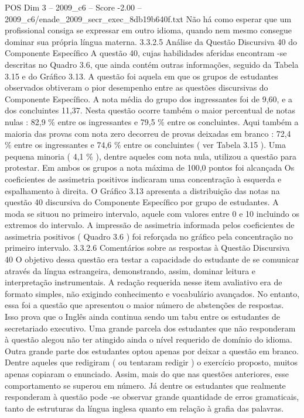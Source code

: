 \begin{textsample}{POS Dim 3 – 2009\_c6 – Score -2.00 – 2009\_c6/enade\_2009\_secr\_exec\_8db19b640f.txt}
Não há como esperar que um profissional consiga se expressar em outro idioma, quando nem mesmo consegue dominar sua própria língua materna. 3.3.2.5 Análise da Questão Discursiva 40 do Componente Específico A questão 40, cujas habilidades aferidas encontram -se descritas no Quadro 3.6, que ainda contém outras informações, seguido da Tabela 3.15 e do Gráfico 3.13.
A questão foi aquela em que os grupos de estudantes observados obtiveram o pior desempenho entre as questões discursivas do Componente Específico.
A nota média do grupo dos ingressantes foi de 9,60, e a dos concluintes 11,37.
Nesta questão ocorre também o maior percentual de notas nulas : 82,9 \% entre os ingressantes e 79,5 \% entre os concluintes.
Aqui também a maioria das provas com nota zero decorreu de provas deixadas em branco : 72,4 \% entre os ingressantes e 74,6 \% entre os concluintes ( ver Tabela 3.15 ).
Uma pequena minoria ( 4,1 \% ), dentre aqueles com nota nula, utilizou a questão para protestar.
Em ambos os grupos a nota máxima de 100,0 pontos foi alcançada Os coeficientes de assimetria positivos indicaram uma concentração à esquerda e espalhamento à direita.
O Gráfico 3.13 apresenta a distribuição das notas na questão 40 discursiva do Componente Específico por grupo de estudantes.
A moda se situou no primeiro intervalo, aquele com valores entre 0 e 10 incluindo os extremos do intervalo.
A impressão de assimetria informada pelos coeficientes de assimetria positivos ( Quadro 3.6 ) foi reforçada no gráfico pela concentração no primeiro intervalo. 3.3.2.6 Comentários sobre as respostas à Questão Discursiva 40 O objetivo dessa questão era testar a capacidade do estudante de se comunicar através da língua estrangeira, demonstrando, assim, dominar leitura e interpretação instrumentais.
A redação requerida nesse item avaliativo era de formato simples, não exigindo conhecimento e vocabulário avançados.
No entanto, essa foi a questão que apresentou o maior número de abstenções de respostas.
Isso prova que o Inglês ainda continua sendo um tabu entre os estudantes de secretariado executivo.
Uma grande parcela dos estudantes que não responderam à questão alegou não ter atingido ainda o nível requerido de domínio do idioma.
Outra grande parte dos estudantes optou apenas por deixar a questão em branco.
Dentre aqueles que redigiram ( ou tentaram redigir ) o exercício proposto, muitos apenas copiaram o enunciado.
Assim, mais do que nas questões anteriores, esse comportamento se superou em número.
Já dentre os estudantes que realmente responderam à questão pode -se observar grande quantidade de erros gramaticais, tanto de estruturas da língua inglesa quanto em relação à grafia das palavras.

\end{textsample}
